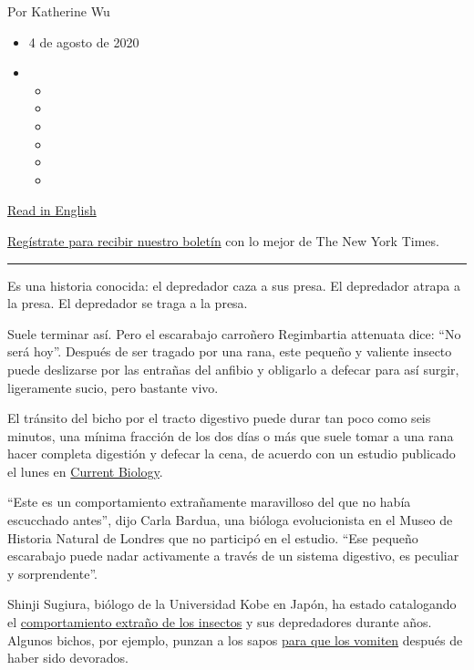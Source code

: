 Por Katherine Wu

\begin{itemize}
\item
  4 de agosto de 2020
\item
  \begin{itemize}
  \item
  \item
  \item
  \item
  \item
  \item
  \end{itemize}
\end{itemize}

\href{https://www.nytimes3xbfgragh.onion/2020/08/03/science/beetle-frog-poop.html}{Read
in English}

\href{https://www.nytimes3xbfgragh.onion/newsletters/el-times}{Regístrate
para recibir nuestro boletín} con lo mejor de The New York Times.

\begin{center}\rule{0.5\linewidth}{\linethickness}\end{center}

Es una historia conocida: el depredador caza a sus presa. El depredador
atrapa a la presa. El depredador se traga a la presa.

Suele terminar así. Pero el escarabajo carroñero Regimbartia attenuata
dice: ``No será hoy''. Después de ser tragado por una rana, este pequeño
y valiente insecto puede deslizarse por las entrañas del anfibio y
obligarlo a defecar para así surgir, ligeramente sucio, pero bastante
vivo.

El tránsito del bicho por el tracto digestivo puede durar tan poco como
seis minutos, una mínima fracción de los dos días o más que suele tomar
a una rana hacer completa digestión y defecar la cena, de acuerdo con un
estudio publicado el lunes en
\href{http://dx.doi.org/10.1016/j.cub.2020.06.026}{Current Biology}.

``Este es un comportamiento extrañamente maravilloso del que no había
escucchado antes'', dijo Carla Bardua, una bióloga evolucionista en el
Museo de Historia Natural de Londres que no participó en el estudio.
``Ese pequeño escarabajo puede nadar activamente a través de un sistema
digestivo, es peculiar y sorprendente''.

Shinji Sugiura, biólogo de la Universidad Kobe en Japón, ha estado
catalogando el \href{https://peerj.com/articles/5942/}{comportamiento
extraño de los insectos} y sus depredadores durante años. Algunos
bichos, por ejemplo, punzan a los sapos
\href{https://www.nytimes3xbfgragh.onion/2018/02/06/science/bombardier-beetle-toad-vomit.html}{para
que los vomiten} después de haber sido devorados.

